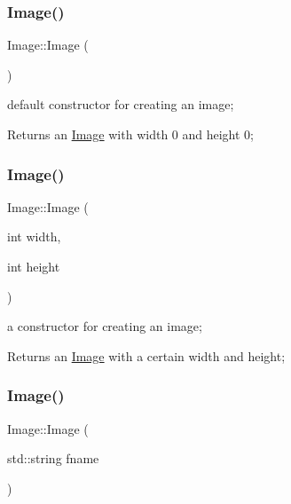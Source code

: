 \subsubsection{\texorpdfstring{Image()}{Image()}\hspace{0.1cm}{\footnotesize\ttfamily [1/4]}}
{\footnotesize\ttfamily Image\+::\+Image (\begin{DoxyParamCaption}{ }\end{DoxyParamCaption})}



default constructor for creating an image; 

\begin{DoxyReturn}{Returns}
an \hyperlink{classImage}{Image} with width 0 and height 0; 
\end{DoxyReturn}
\mbox{\label{classImage_afb0339b802ed560e69eb07358d30198f}} 
\subsubsection{\texorpdfstring{Image()}{Image()}\hspace{0.1cm}{\footnotesize\ttfamily [2/4]}}
{\footnotesize\ttfamily Image\+::\+Image (\begin{DoxyParamCaption}\item[{int}]{width,  }\item[{int}]{height }\end{DoxyParamCaption})}



a constructor for creating an image; 

\begin{DoxyReturn}{Returns}
an \hyperlink{classImage}{Image} with a certain width and height; 
\end{DoxyReturn}
\mbox{\label{classImage_a5ab2d611b6c128521a51380c25843f49}} 
\subsubsection{\texorpdfstring{Image()}{Image()}\hspace{0.1cm}{\footnotesize\ttfamily [3/4]}}
{\footnotesize\ttfamily Image\+::\+Image (\begin{DoxyParamCaption}\item[{std\+::string}]{fname }\end{DoxyParamCaption})}



